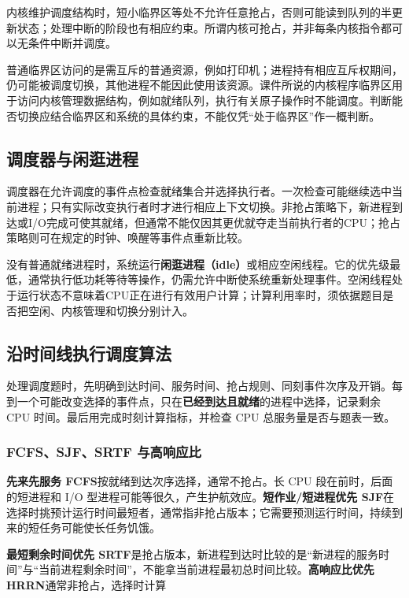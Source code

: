 内核维护调度结构时，短小临界区等处不允许任意抢占，否则可能读到队列的半更新状态；处理中断的阶段也有相应约束。所谓内核可抢占，并非每条内核指令都可以无条件中断并调度。

普通临界区访问的是需互斥的普通资源，例如打印机；进程持有相应互斥权期间，仍可能被调度切换，其他进程不能因此使用该资源。课件所说的内核程序临界区用于访问内核管理数据结构，例如就绪队列，执行有关原子操作时不能调度。判断能否切换应结合临界区和系统的具体约束，不能仅凭``处于临界区''作一概判断。

\subsection{调度器与闲逛进程}\label{OS02-idle}

调度器在允许调度的事件点检查就绪集合并选择执行者。一次检查可能继续选中当前进程；只有实际改变执行者时才进行相应上下文切换。非抢占策略下，新进程到达或I/O完成可使其就绪，但通常不能仅因其更优就夺走当前执行者的CPU；抢占策略则可在规定的时钟、唤醒等事件点重新比较。

没有普通就绪进程时，系统运行\textbf{闲逛进程（idle）}或相应空闲线程。它的优先级最低，通常执行低功耗等待等操作，仍需允许中断使系统重新处理事件。空闲线程处于运行状态不意味着CPU正在进行有效用户计算；计算利用率时，须依据题目是否把空闲、内核管理和切换分别计入。

\subsection{沿时间线执行调度算法}\label{OS02-2-8}

处理调度题时，先明确到达时间、服务时间、抢占规则、同刻事件次序及开销。每到一个可能改变选择的事件点，只在\textbf{已经到达且就绪}的进程中选择，记录剩余 CPU 时间。最后用完成时刻计算指标，并检查 CPU 总服务量是否与题表一致。

\subsubsection{FCFS、SJF、SRTF 与高响应比}\label{OS02-auto-1}

\textbf{先来先服务 FCFS}按就绪到达次序选择，通常不抢占。长 CPU 段在前时，后面的短进程和 I/O 型进程可能等很久，产生护航效应。\textbf{短作业/短进程优先 SJF}在选择时挑预计运行时间最短者，通常指非抢占版本；它需要预测运行时间，持续到来的短任务可能使长任务饥饿。

\textbf{最短剩余时间优先 SRTF}是抢占版本，新进程到达时比较的是``新进程的服务时间''与``当前进程剩余时间''，不能拿当前进程最初总时间比较。\textbf{高响应比优先 HRRN}通常非抢占，选择时计算


